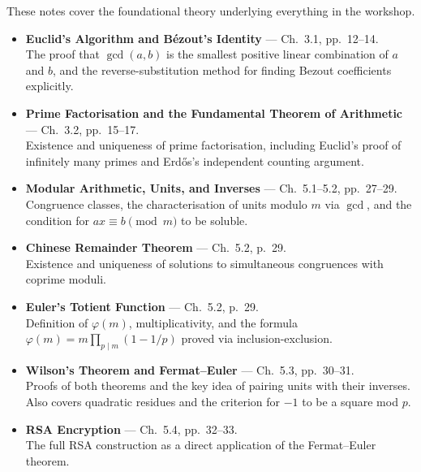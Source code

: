 \documentclass[11pt]{article}
\begin{document}
These notes cover the foundational theory underlying everything in the workshop.
\vspace{0.5em}
\begin{itemize}
    \item \textbf{Euclid's Algorithm and B\'{e}zout's Identity} --- Ch.~3.1, pp.~12--14. \\
    The proof that $\gcd(a,b)$ is the smallest positive linear combination of $a$ and $b$, and the reverse-substitution method for finding Bezout coefficients explicitly.

    \item \textbf{Prime Factorisation and the Fundamental Theorem of Arithmetic} --- Ch.~3.2, pp.~15--17. \\
    Existence and uniqueness of prime factorisation, including Euclid's proof of infinitely many primes and Erd\H{o}s's independent counting argument.

    \item \textbf{Modular Arithmetic, Units, and Inverses} --- Ch.~5.1--5.2, pp.~27--29. \\
    Congruence classes, the characterisation of units modulo $m$ via $\gcd$, and the condition for $ax \equiv b \pmod{m}$ to be soluble.

    \item \textbf{Chinese Remainder Theorem} --- Ch.~5.2, p.~29. \\
    Existence and uniqueness of solutions to simultaneous congruences with coprime moduli.

    \item \textbf{Euler's Totient Function} --- Ch.~5.2, p.~29. \\
    Definition of $\varphi(m)$, multiplicativity, and the formula $\varphi(m) = m \prod_{p \mid m}(1 - 1/p)$ proved via inclusion-exclusion.

    \item \textbf{Wilson's Theorem and Fermat--Euler} --- Ch.~5.3, pp.~30--31. \\
    Proofs of both theorems and the key idea of pairing units with their inverses. Also covers quadratic residues and the criterion for $-1$ to be a square mod $p$.

    \item \textbf{RSA Encryption} --- Ch.~5.4, pp.~32--33. \\
    The full RSA construction as a direct application of the Fermat--Euler theorem.
\end{itemize}
\end{document}
